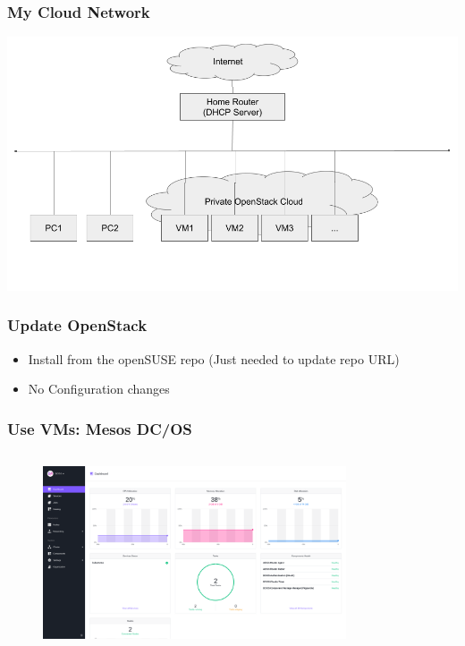 \documentclass[aspectratio=169,11pt,hyperref={colorlinks=true}]{beamer}
\begin{document}
\begin{frame}
  \frametitle{My Cloud Network}
  \includegraphics[width=1.0\textwidth]{my_openstack_network.png}
\end{frame}

\begin{frame}
  \frametitle{Update OpenStack}
  \begin{itemize}
    \item Install from the openSUSE repo (Just needed to update repo URL)
    \item No Configuration changes
  \end{itemize}
\end{frame}

\begin{frame}
  \frametitle{Use VMs: Mesos DC/OS}
  \begin{columns}[T]
    \begin{column}{1.0\textwidth}
      \begin{figure}
        \includegraphics[width=0.8\textwidth]{mesos.png}
      \end{figure}
    \end{column}
  \end{columns}
\end{frame}
\end{document}
